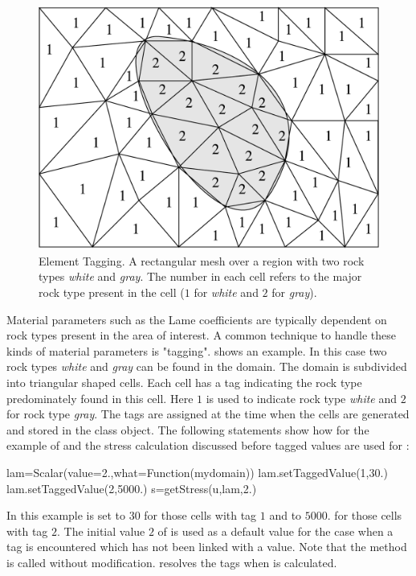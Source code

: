 \begin{figure}
\includegraphics[width=\textwidth]{figures/EscriptDiagram2.eps}
\caption{\label{Figure: tag}Element Tagging. A rectangular mesh over a region with two rock types {\it white} and {\it gray}.
The number in each cell refers to the major rock type present in the cell ($1$ for {\it white} and $2$ for {\it gray}).
}
\end{figure}

Material parameters such as the Lame coefficients are typically dependent on rock types present in the 
area of interest. A common technique to handle these kinds of material parameters is "tagging". 
shows an example. In this case two rock types {\it white} and {\it gray} can be found in the domain. The domain
is subdivided into triangular shaped cells. Each 
cell has a tag indicating the rock type predominately found in this cell. Here $1$ is used to indicate
rock type {\it white} and $2$ for rock type {\it gray}. The tags are assigned at the time when the cells are generated
and stored in the \Domain class object. The following statements show how for the
example of  and the stress calculation discussed before tagged values are used for
:
\begin{python}
lam=Scalar(value=2.,what=Function(mydomain))
lam.setTaggedValue(1,30.)
lam.setTaggedValue(2,5000.)
s=getStress(u,lam,2.)
\end{python}
In this example  is set to $30$ for those cells with tag $1$ and to $5000.$ for those cells 
with tag $2$. The initial value $2$ of  is used as a default value for the case when a tag
is encountered which has not been linked with a value. Note that the  method
is called without modification. \escript resolves the tags when  is calculated.

